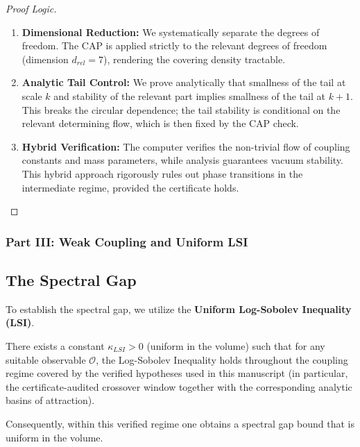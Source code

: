 \begin{proof}[Proof Logic]
\begin{enumerate}
    \item \textbf{Dimensional Reduction:} We systematically separate the degrees of freedom. The CAP is applied strictly to the relevant degrees of freedom (dimension \(d_{rel}=7\)), rendering the covering density tractable.
    \item \textbf{Analytic Tail Control:} We prove analytically that smallness of the tail at scale $k$ and stability of the relevant part implies smallness of the tail at $k+1$. This breaks the circular dependence; the tail stability is conditional on the relevant determining flow, which is then fixed by the CAP check.
    \item \textbf{Hybrid Verification:} The computer verifies the non-trivial flow of coupling constants and mass parameters, while analysis guarantees vacuum stability. This hybrid approach rigorously rules out phase transitions in the intermediate regime, provided the certificate holds.
\end{enumerate}
\end{proof}

\subsubsection*{Part III: Weak Coupling and Uniform LSI}
\subsection{The Spectral Gap}
\label{subsec:spectral_gap}

To establish the spectral gap, we utilize the \textbf{Uniform Log-Sobolev Inequality (LSI)}.

\begin{theorem}
\label{thm:uniform-LSI-weak}
There exists a constant \(\kappa_{LSI} > 0\) (uniform in the volume) such that for any suitable observable \(\mathcal{O}\), the Log-Sobolev Inequality holds throughout the coupling regime covered by the verified hypotheses used in this manuscript (in particular, the certificate-audited crossover window together with the corresponding analytic basins of attraction).

Consequently, within this verified regime one obtains a spectral gap bound that is uniform in the volume.
\end{theorem}

